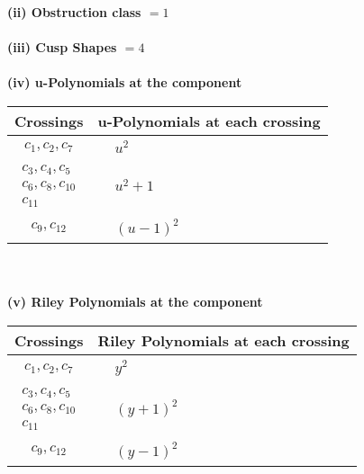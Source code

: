 \documentclass[1p]{elsarticle_modified}
\theoremstyle{definition}
\begin{document}
\flushleft \textbf{(ii) Obstruction class $= 1$}\\~\\
\flushleft \textbf{(iii) Cusp Shapes $= 4$}\\~\\
\newpage\renewcommand{\arraystretch}{1}
\flushleft \textbf{(iv) u-Polynomials at the component}\newline \\
\begin{tabular}{m{50pt}|m{274pt}}
Crossings & \hspace{64pt}u-Polynomials at each crossing \\
\hline $$\begin{aligned}c_{1},c_{2},c_{7}\end{aligned}$$&$\begin{aligned}
&u^2
\end{aligned}$\\
\hline $$\begin{aligned}c_{3},c_{4},c_{5}\\c_{6},c_{8},c_{10}\\c_{11}\end{aligned}$$&$\begin{aligned}
&u^2+1
\end{aligned}$\\
\hline $$\begin{aligned}c_{9},c_{12}\end{aligned}$$&$\begin{aligned}
&(u-1)^2
\end{aligned}$\\
\hline
\end{tabular}\\~\\
\newpage\renewcommand{\arraystretch}{1}
\flushleft \textbf{(v) Riley Polynomials at the component}\newline \\
\begin{tabular}{m{50pt}|m{274pt}}
Crossings & \hspace{64pt}Riley Polynomials at each crossing \\
\hline $$\begin{aligned}c_{1},c_{2},c_{7}\end{aligned}$$&$\begin{aligned}
&y^2
\end{aligned}$\\
\hline $$\begin{aligned}c_{3},c_{4},c_{5}\\c_{6},c_{8},c_{10}\\c_{11}\end{aligned}$$&$\begin{aligned}
&(y+1)^2
\end{aligned}$\\
\hline $$\begin{aligned}c_{9},c_{12}\end{aligned}$$&$\begin{aligned}
&(y-1)^2
\end{aligned}$\\
\hline
\end{tabular}\\~\\
\end{document}
